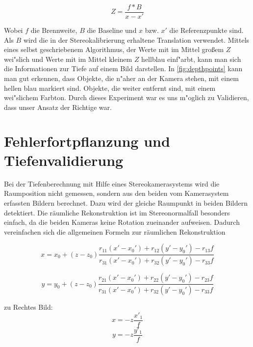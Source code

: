 \begin{equation}\label{eq:dep}
Z=\frac{f*B}{x-x'}
\end{equation}

\noindent Wobei $f$ die Brennweite, $B$ die Baseline und $x$ bzw. $x'$ die Referenzpunkte sind. Als $B$ wird die in der Stereokalibrierung erhaltene Translation verwendet.\newline
Mittels eines selbst geschriebenem Algorithmus, der Werte mit im Mittel großem $Z$ wei"slich und Werte mit im Mittel kleinem $Z$ hellblau einf"arbt, kann man sich die Informationen zur Tiefe auf einem Bild darstellen.\newline
In \ref{fig:depthpoints} kann man gut erkennen, dass Objekte, die n"aher an der Kamera stehen, mit einem hellen blau markiert sind. Objekte, die weiter entfernt sind, mit einem wei"slichem Farbton. Durch dieses Experiment war es uns m"oglich zu Validieren, dass unser Ansatz der Richtige war.

\section{Fehlerfortpflanzung und Tiefenvalidierung}
\label{sec:fehlerfortpflanzungtiefen}

Bei der Tiefenberechnung mit Hilfe eines Stereokamerasystems wird die Raumposition nicht gemessen, sondern aus den beiden vom Kamerasystem erfassten Bildern berechnet. Dazu wird der gleiche Raumpunkt in beiden Bildern detektiert. Die räumliche Rekonstruktion ist im Stereonormalfall besonders einfach, da die beiden Kameras keine Rotation zueinander aufweisen. Dadurch vereinfachen sich die allgemeinen Formeln zur räumlichen Rekonstruktion \cite{frz}

\begin{equation}
x = x_{0} + (z - z_{0})\frac
{r_{11}(x'-x_{0}') + r_{12}(y'-y_{0}')-r_{13}f}
{r_{31}(x'-x_{0}') + r_{32}(y'-y_{0}')-r_{33}f}
\end{equation}

\begin{equation}
y = y_{0} + (z - z_{0})\frac
{r_{21}(x'-x_{0}') + r_{22}(y'-y_{0}')-r_{23}f}
{r_{31}(x'-x_{0}') + r_{32}(y'-y_{0}')-r_{33}f}
\end{equation}

\noindent zu\newline
\noindent Rechtes Bild:
\begin{equation}\label{eq:one}
x = -z \frac{x'_{1}}{f}
\end{equation}
\begin{equation}\label{eq:two}
y = -z \frac{y'_{1}}{f}
\end{equation}

